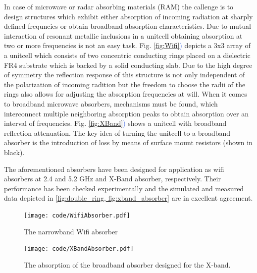 \documentclass[a4paper,12pt]{scrartcl}  %
\newcommand{\capFref}[1]{Fig. \ref{#1}\textcolor{RoyalBlue}{)}}
\begin{document}
In case of microwave or radar absorbing materials (RAM) the callenge is to design structures
which exhibit either absorption of incoming radiation at sharply defined frequncies or obtain broadband
absorption characteristics. 
Due to mutual interaction of resonant metallic inclusions in a unitcell obtaining absorption at two or more 
frequencies is not an easy task. \capFref{fig:Wifi} depicts a 3x3 array of a unitcell which consists of two concentric conducting rings placed on a dielectric FR4 substrate which is backed by a solid conducting slab. Due to the high degree of symmetry the reflection response of this structure is not only independent of the polarization of incoming radition but the freedom to choose the radii of the rings also allows for adjusting the absorption frequencies at will.
When it comes to broadband microwave absorbers, mechanisms must be found, which interconnect multiple neighboring absorption peaks to obtain absorption over an interval of frequencies. \capFref{fig:XBand} shows 
a unitcell with broadband reflection attenuation. The key idea of turning the unitcell to a broadband absorber is the introduction of loss by means of surface mount resistors (shown in black).

The aforementioned absorbers have been designed for application as wifi absorbers at 2.4 and 5.2 GHz and X-Band absorber, respectively. Their performance has been checked experimentally and the simulated and measured data depicted in \cref{fig:double_ring, fig:xband_absorber} are in excellent agreement.

\begin{figure}
\centering
\begin{minipage}[b]{0.5\textwidth}
\texttt{[image: code/WifiAbsorber.pdf]}
\caption{The narrowband Wifi absorber}
\label{fig:WifiMeas}
\hspace{55pt}
\end{minipage}
\begin{minipage}[b]{0.4\textwidth}
\texttt{[image: code/XBandAbsorber.pdf]}
\caption{The absorption of the broadband absorber designed for the X-band.}
\label{fig:XBandMeas}
\end{minipage}
\end{figure}

%
\end{document}
